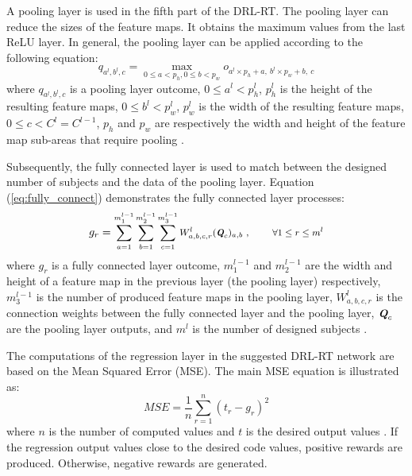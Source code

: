 \documentclass[conference]{IEEEtran}
\begin{document}
		A pooling layer is used in the fifth part of the DRL-RT. The pooling layer can reduce the sizes of the feature maps. It obtains the maximum values from the last ReLU layer. In general, the pooling layer can be applied according to the following equation:
		\begin{equation}
		q_{a^{l},b^{l},c}=\underset{0\leq a<p_h,0\leq b<p_w}{\max} o_{a^{l}\times p_h+a,~b^{l}\times p_w+b,~c}
		\label{eq:pooling_layer}
		\end{equation}
		where $q_{a^{l},b^{l},c}$ is a pooling layer outcome, $0\leq a^{l} <p_h^{l}$, $p_h^{l}$ is the height of the resulting feature maps, $0\leq b^{l} <p_w^{l}$, $p_w^{l}$ is the width of the resulting feature maps, $0\leq c <C^{l}=C^{l-1}$, $p_h$ and $p_w$ are respectively the width and height of the feature map sub-areas that require pooling \cite{wu2017introduction}. 
	
		Subsequently, the fully connected layer is used to match between the designed number of subjects and the data of the pooling layer. Equation (\ref{eq:fully_connect}) demonstrates the fully connected layer processes:
		\begin{equation}
		g_{r}=\text{\footnotesize $\sum_{a=1}^{m_1^{l-1}} \sum_{b=1}^{m_2^{l-1}} \sum_{c=1}^{m_3^{l-1}} W_{a,b,c,r}^{l}(\textit{\textbf{Q}}_{c})_{a,b}~, ~~~~~~~\forall 1 \leq r \leq m^{l}$}
		\label{eq:fully_connect}
		\end{equation}
		where $g_{r}$ is a fully connected layer outcome, $m_1^{l-1}$ and $m_2^{l-1}$ are the width and height of a feature map in the previous layer (the pooling layer) respectively, $m_3^{l-1}$ is the number of produced feature maps in the pooling layer, $W_{a,b,c,r}^{l}$ is the connection weights between the fully connected layer and the pooling layer, $\textit{\textbf{Q}}_{c}$ are the pooling layer outputs, and $m^{l}$ is the number of designed subjects \cite{stutz2014neural}.
	
		The computations of the regression layer in the suggested DRL-RT network are based on the Mean Squared Error (MSE). The main MSE equation is illustrated as:
		\begin{equation}
			MSE=\frac{1}{n} \sum_{r=1}^{n}(t_r-g_r)^2
			\label{eq:fully_connect}
		\end{equation}
		where $n$ is the number of computed values and $t$ is the desired output values \cite{saugirouglu2009intelligent}. If the regression output values close to the desired code values, positive rewards are produced. Otherwise, negative rewards are generated. 
		
\end{document}
